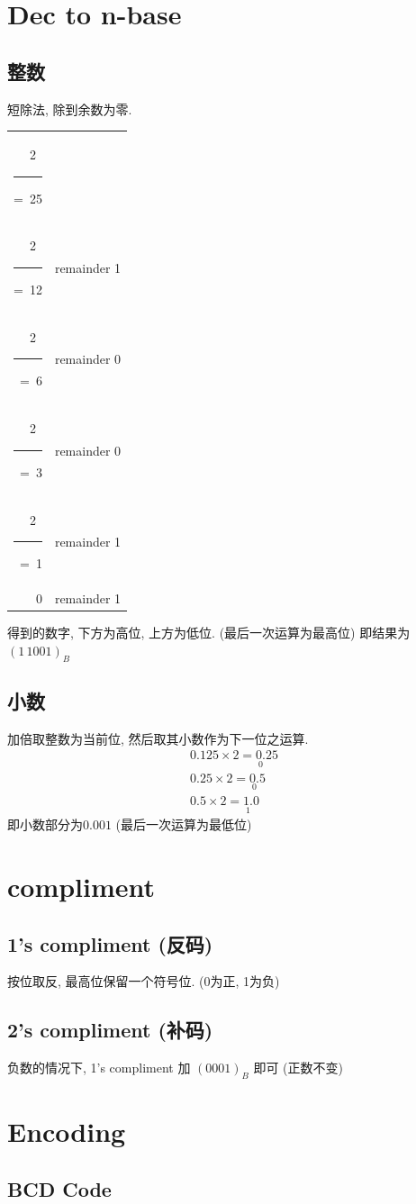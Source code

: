 \documentclass[scheme=chinese,a4paper]{report}
\def\rlwd{.5pt} \def\rlht{2.2ex} \def\rldp{.5ex}
\def\mydiv#1{~%
  \rule[-\rldp]{\rlwd}{\rlht}%
  \setbox0=\hbox{~#1}%
  \stackunder[\dimexpr\rldp-\rlwd]{~#1}{\rule{\wd0}{\rlwd}}%
}
\begin{document}
\section{Dec to n-base}
\subsection{整数}
短除法, 除到余数为零. \\
\begin{tabular}{rl} 
2\mydiv{25} &\\
2\mydiv{12}  & remainder 1\\
2\mydiv{6}  & remainder 0\\
2\mydiv{3}   & remainder 0\\
2\mydiv{1}            & remainder 1\\
0&remainder 1
\end{tabular}

得到的数字, 下方为高位, 上方为低位. (最后一次运算为最高位) 即结果为$(1\,1001)_B$
\subsection{小数}
加倍取整数为当前位, 然后取其小数作为下一位之运算. 
\begin{align}
    0.125\times 2 = \underset{0}{0.}25 \\
    0.25\times 2 = \underset{0}{0.}5\\
    0.5\times 2=\underset{1}{1.}0
\end{align}
即小数部分为$0.001$ (最后一次运算为最低位)
\section{compliment}
\subsection{1's compliment (反码)}
按位取反, 最高位保留一个符号位. (0为正, 1为负)
\subsection{2's compliment (补码)}
负数的情况下, 1's compliment 加 $ (0001)_B $ 即可 (正数不变)
\section{Encoding}
\subsection{BCD Code}
\end{document}
